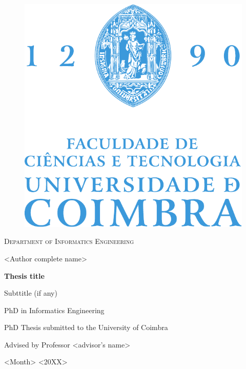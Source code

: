 \thispagestyle{empty}

\mbox{}
\vspace{1cm}

\begin{center}

\begin{figure}[h!]
	\begin{center}
	\includegraphics[width=0.35\linewidth]{frontmatter/FCTUC_logo.pdf}	
	\end{center}
\end{figure}

\small
\textsc{Department of Informatics Engineering}


\vspace{1.5cm}


\Large
<Author complete name>

\vspace{2cm}

\Huge
\textbf{\textsf{Thesis title}}

\LARGE
\textsf{Subttitle (if any)}

\vspace{3cm}

\normalsize


PhD in Informatics Engineering

PhD Thesis submitted to the University of Coimbra

Advised by Professor <advisor's name>

\vspace{1.5cm}

<Month> <20XX>



\end{center}
